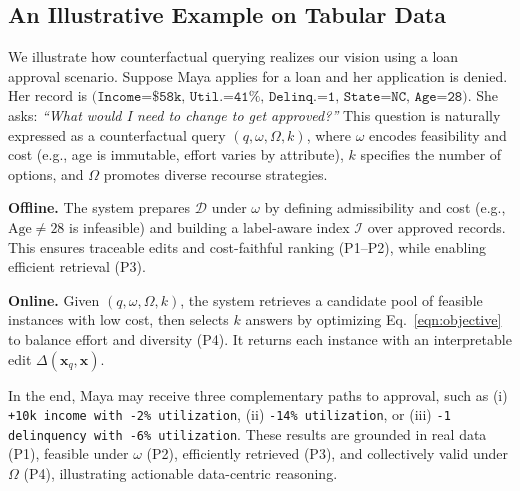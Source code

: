 \subsection{An Illustrative Example on Tabular Data}

We illustrate how counterfactual querying realizes our vision using a loan approval scenario. Suppose Maya applies for a loan and her application is denied. Her record is
$
\texttt{(Income=\$58k, Util.=41\%, Delinq.=1, State=NC, Age=28)}.
$
She asks: \emph{``What would I need to change to get approved?''} This question is naturally expressed as a counterfactual query $(q,\omega,\Omega,k)$, where $\omega$ encodes feasibility and cost (e.g., age is immutable, effort varies by attribute), $k$ specifies the number of options, and $\Omega$ promotes diverse recourse strategies.

\textbf{Offline.} The system prepares $\mathcal D$ under $\omega$ by defining admissibility and cost (e.g., $\text{Age} \neq 28$ is infeasible) and building a label-aware index $\mathcal I$ over approved records. This ensures traceable edits and cost-faithful ranking (P1--P2), while enabling efficient retrieval (P3).

\textbf{Online.} Given $(q,\omega,\Omega,k)$, the system retrieves a candidate pool of feasible instances with low cost, then selects $k$ answers by optimizing Eq.~\eqref{eqn:objective} to balance effort and diversity (P4). It returns each instance with an interpretable edit $\Delta(\mathbf{x}_q,\mathbf{x})$.

In the end, Maya may receive three complementary paths to approval, such as (i) \texttt{+10k income with -2\% utilization}, (ii) \texttt{-14\% utilization}, or (iii) \texttt{-1 delinquency with -6\% utilization}. These results are grounded in real data (P1), feasible under $\omega$ (P2), efficiently retrieved (P3), and collectively valid under $\Omega$ (P4), illustrating actionable data-centric reasoning.
